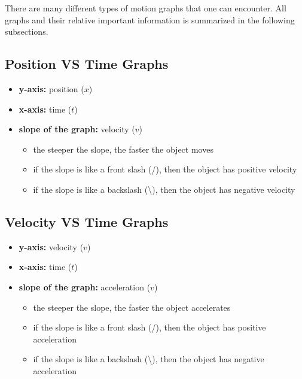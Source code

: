 \documentclass{package/notes}
\begin{document}
There are many different types of motion graphs that one can encounter. All graphs and their relative important information is summarized in the following subsections.

\subsection{Position VS Time Graphs}


\begin{itemize}
	\item \textbf{y-axis:} position ($x$)
	\item \textbf{x-axis:} time ($t$)
	\item \textbf{slope of the graph:} velocity ($v$)
	\begin{itemize}
		\item the steeper the slope, the faster the object moves
		\item if the slope is like a front slash (/), then the object has positive velocity
		\item if the slope is like a backslash (\textbackslash), then the object has negative velocity
	\end{itemize}
\end{itemize}


\subsection{Velocity VS Time Graphs}


\begin{itemize}
	\item \textbf{y-axis:} velocity ($v$)
	\item \textbf{x-axis:} time ($t$)
	\item \textbf{slope of the graph:} acceleration ($v$)
	\begin{itemize}
		\item the steeper the slope, the faster the object accelerates
		\item if the slope is like a front slash (/), then the object has positive acceleration
		\item if the slope is like a backslash (\textbackslash), then the object has negative acceleration
	\end{itemize}
\end{itemize}
\end{document}
